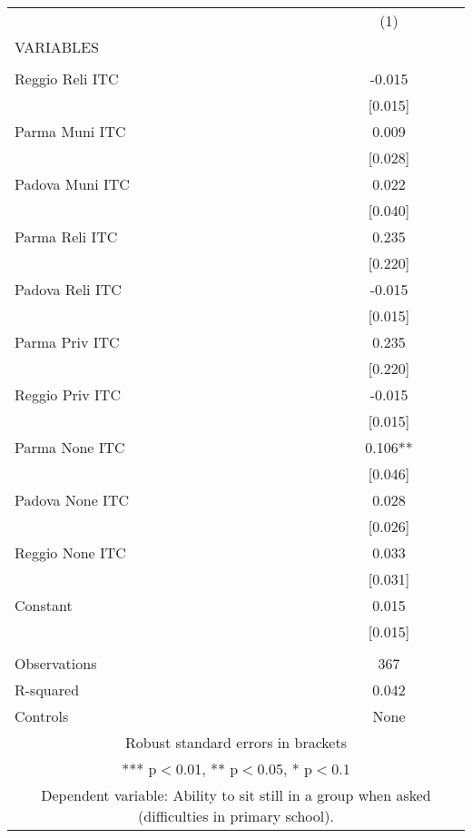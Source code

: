 \begin{tabular}{lc} \hline
 & (1) \\
VARIABLES &  \\ \hline
 &  \\
Reggio Reli ITC & -0.015 \\
 & [0.015] \\
Parma Muni ITC & 0.009 \\
 & [0.028] \\
Padova Muni ITC & 0.022 \\
 & [0.040] \\
Parma Reli ITC & 0.235 \\
 & [0.220] \\
Padova Reli ITC & -0.015 \\
 & [0.015] \\
Parma Priv ITC & 0.235 \\
 & [0.220] \\
Reggio Priv ITC & -0.015 \\
 & [0.015] \\
Parma None ITC & 0.106** \\
 & [0.046] \\
Padova None ITC & 0.028 \\
 & [0.026] \\
Reggio None ITC & 0.033 \\
 & [0.031] \\
Constant & 0.015 \\
 & [0.015] \\
 &  \\
Observations & 367 \\
R-squared & 0.042 \\
 Controls & None \\ \hline
\multicolumn{2}{c}{ Robust standard errors in brackets} \\
\multicolumn{2}{c}{ *** p$<$0.01, ** p$<$0.05, * p$<$0.1} \\
\multicolumn{2}{c}{ Dependent variable: Ability to sit still in a group when asked (difficulties in primary school).} \\
\end{tabular}

